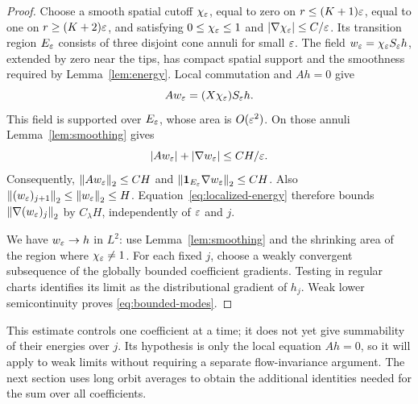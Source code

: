 \begin{proof}
Choose a smooth spatial cutoff \(\chi_\varepsilon\), equal to zero on
\(r\le(K+1)\varepsilon\), equal to one on \(r\ge(K+2)\varepsilon\), and
satisfying \(0\le\chi_\varepsilon\le1\) and
\(|\nabla\chi_\varepsilon|\le C/\varepsilon\). Its transition region
\(E_\varepsilon\) consists of three disjoint cone annuli for small
\(\varepsilon\). The field
\(w_\varepsilon=\chi_\varepsilon S_\varepsilon h\), extended by zero near the tips,
has compact spatial support and the smoothness required by
Lemma~\ref{lem:energy}. Local commutation and \(Ah=0\) give
\[
 Aw_\varepsilon=(X\chi_\varepsilon)S_\varepsilon h.
\]
This field is supported over \(E_\varepsilon\), whose area is
\(O(\varepsilon^2)\). On those annuli Lemma~\ref{lem:smoothing} gives
\[
 |Aw_\varepsilon|+|\nabla w_\varepsilon|\le CH/\varepsilon.
\]
Consequently,
\(\left\lVert Aw_\varepsilon\right\rVert_2\le CH\) and
\(\left\lVert\mathbf 1_{E_\varepsilon}\nabla w_\varepsilon\right\rVert_2\le CH\).
Also \(\left\lVert(w_\varepsilon)_{j+1}\right\rVert_2\le\left\lVert w_\varepsilon\right\rVert_2\le H\).
Equation~\eqref{eq:localized-energy} therefore bounds
\(\left\lVert\nabla(w_\varepsilon)_j\right\rVert_2\) by \(C_\lambda H\), independently
of \(\varepsilon\) and \(j\).

We have \(w_\varepsilon\to h\) in \(L^2\): use
Lemma~\ref{lem:smoothing} and the shrinking area of the region where
\(\chi_\varepsilon\ne1\). For each fixed \(j\), choose a weakly convergent
subsequence of the globally bounded coefficient gradients. Testing in
regular charts identifies its limit as the distributional gradient
of \(h_j\). Weak lower semicontinuity proves
\eqref{eq:bounded-modes}.
\end{proof}

This estimate controls one coefficient at a time; it does not yet
give summability of their energies over \(j\). Its hypothesis is only
the local equation \(Ah=0\), so it will apply to weak limits without
requiring a separate flow-invariance argument. The next section uses
long orbit averages to obtain the additional identities needed for
the sum over all coefficients.
